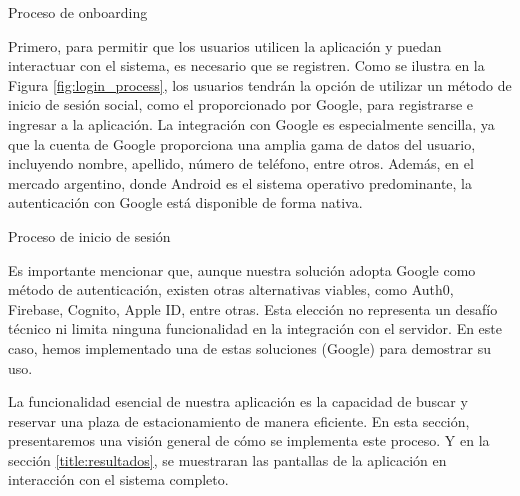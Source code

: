 \begin{images}[\label{onboarding_process}]{Proceso de onboarding}
\end{images}

Primero, para permitir que los usuarios utilicen la aplicación y puedan interactuar con el sistema, es necesario que se registren. Como se ilustra en la Figura \ref{fig:login_process}, los usuarios tendrán la opción de utilizar un método de inicio de sesión social, como el proporcionado por Google, para registrarse e ingresar a la aplicación. La integración con Google es especialmente sencilla, ya que la cuenta de Google proporciona una amplia gama de datos del usuario, incluyendo nombre, apellido, número de teléfono, entre otros. Además, en el mercado argentino, donde Android es el sistema operativo predominante, la autenticación con Google está disponible de forma nativa.

\begin{images}[\label{fig:login_process}]{Proceso de inicio de sesión}
\end{images}

Es importante mencionar que, aunque nuestra solución adopta Google como método de autenticación, existen otras alternativas viables, como Auth0, Firebase, Cognito, Apple ID, entre otras. Esta elección no representa un desafío técnico ni limita ninguna funcionalidad en la integración con el servidor. En este caso, hemos implementado una de estas soluciones (Google) para demostrar su uso.

La funcionalidad esencial de nuestra aplicación es la capacidad de buscar y reservar una plaza de estacionamiento de manera eficiente. En esta sección, presentaremos una visión general de cómo se implementa este proceso. Y en la sección \ref{title:resultados}, se muestraran las pantallas de la aplicación en interacción con el sistema completo.

